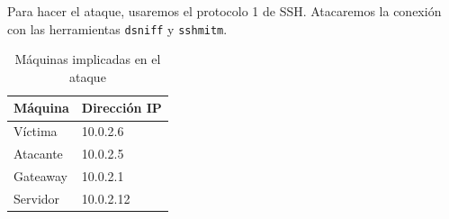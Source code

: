 \documentclass[10pt,a4paper,spanish]{article}
\begin{document}
Para hacer el ataque, usaremos el protocolo 1 de SSH. Atacaremos la conexión con las herramientas \texttt{dsniff} y \texttt{sshmitm}.

\begin{table}[H]
    \centering
    \begin{tabular}{|l|l|}
    \hline
    Máquina & Dirección IP \\
    \hline
    Víctima & 10.0.2.6 \\
    \hline
    Atacante & 10.0.2.5 \\
    \hline
    Gateaway & 10.0.2.1 \\
    \hline
    Servidor & 10.0.2.12 \\
    \hline
    \end{tabular}
    \caption{Máquinas implicadas en el ataque}
    \label{maquinas}
\end{table}

 

\end{document}
